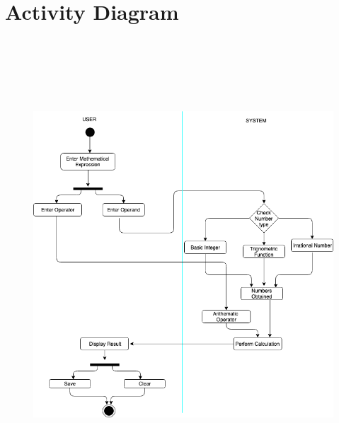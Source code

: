 \documentclass[12pt]{report}
\begin{document}
\vspace{\baselineskip}

\vspace{\baselineskip}

\vspace{\baselineskip}

\vspace{\baselineskip}

\vspace{\baselineskip}

\vspace{\baselineskip}
\section*{Activity Diagram}

\vspace{\baselineskip}



\begin{figure}[H]
	\begin{Center}
		\includegraphics[width=6.5in,height=6.64in]{./image10.png}
	\end{Center}
\end{figure}
\end{document}
